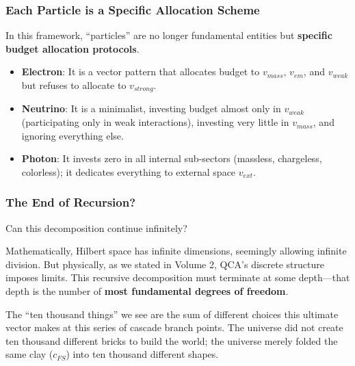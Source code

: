 \subsubsection{Each Particle is a Specific Allocation Scheme}

In this framework, ``particles'' are no longer fundamental entities but \textbf{specific budget allocation protocols}.

\begin{itemize}
\item \textbf{Electron}: It is a vector pattern that allocates budget to $v_{mass}$, $v_{em}$, and $v_{weak}$ but refuses to allocate to $v_{strong}$.

\item \textbf{Neutrino}: It is a minimalist, investing budget almost only in $v_{weak}$ (participating only in weak interactions), investing very little in $v_{mass}$, and ignoring everything else.

\item \textbf{Photon}: It invests zero in all internal sub-sectors (massless, chargeless, colorless); it dedicates everything to external space $v_{ext}$.
\end{itemize}

\subsubsection{The End of Recursion?}

Can this decomposition continue infinitely?

Mathematically, Hilbert space has infinite dimensions, seemingly allowing infinite division. But physically, as we stated in Volume 2, QCA's discrete structure imposes limits. This recursive decomposition must terminate at some depth---that depth is the number of \textbf{most fundamental degrees of freedom}.

The ``ten thousand things'' we see are the sum of different choices this ultimate vector makes at this series of cascade branch points. The universe did not create ten thousand different bricks to build the world; the universe merely folded the same clay ($c_{FS}$) into ten thousand different shapes.

